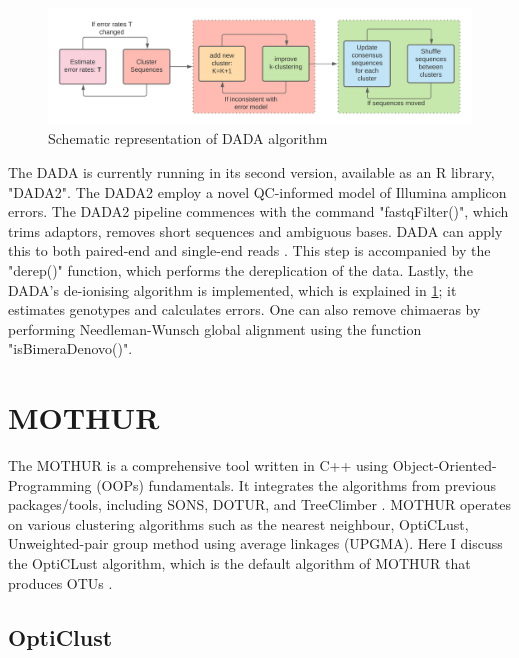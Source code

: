 \begin{figure}
  \centering
  \includegraphics[width=15cm]{../figures/Figure4.png}
  \caption{Schematic representation of DADA algorithm}
  \label{fig:figure4}
\end{figure}

The DADA is currently running in its second version, available as an R library, "DADA2". The DADA2 employ a novel QC-informed model of Illumina amplicon errors. The DADA2 pipeline commences with the command "fastqFilter()", which trims adaptors, removes short sequences and ambiguous bases. DADA can apply this to both paired-end and single-end reads \cite{ref17}. This step is accompanied by the "derep()" function, which performs the dereplication of the data. Lastly, the DADA's de-ionising algorithm is implemented, which is explained in  \ref{fig:figure4}; it estimates genotypes and calculates errors. One can also remove chimaeras by performing Needleman-Wunsch global alignment using the function "isBimeraDenovo()".

\section{MOTHUR}
The MOTHUR is a comprehensive tool written in C++ using Object-Oriented-Programming (OOPs) fundamentals. It integrates the algorithms from previous packages/tools, including SONS, DOTUR, and TreeClimber \cite{ref18}. MOTHUR operates on various clustering algorithms such as the nearest neighbour, OptiCLust, Unweighted-pair group method using average linkages (UPGMA). Here I discuss the OptiCLust algorithm, which is the default algorithm of MOTHUR that produces OTUs \cite{ref18}.

\subsection*{OptiClust}

